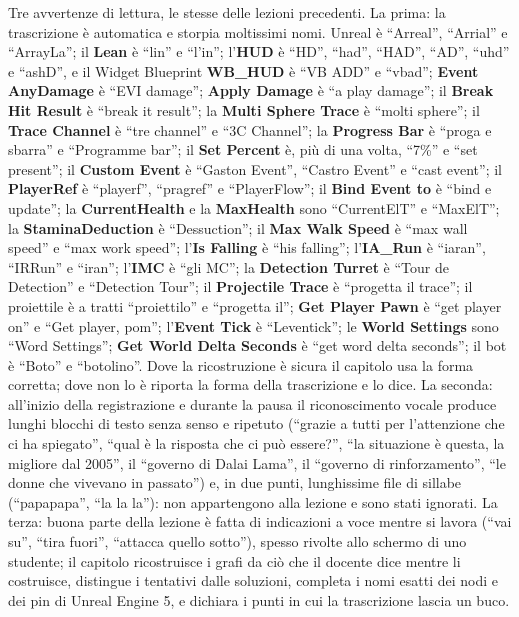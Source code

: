 Tre avvertenze di lettura, le stesse delle lezioni precedenti. La prima: la trascrizione
è automatica e storpia moltissimi nomi. Unreal è ``Arreal'', ``Arrial'' e ``ArrayLa'';
il \textbf{Lean} è ``lin'' e ``l'in''; l'\textbf{HUD} è ``HD'', ``had'', ``HAD'',
``AD'', ``uhd'' e ``ashD'', e il Widget Blueprint \textbf{WB\_HUD} è ``VB ADD'' e
``vbad''; \textbf{Event AnyDamage} è ``EVI damage''; \textbf{Apply Damage} è ``a play
damage''; il \textbf{Break Hit Result} è ``break it result''; la \textbf{Multi Sphere
Trace} è ``molti sphere''; il \textbf{Trace Channel} è ``tre channel'' e ``3C Channel'';
la \textbf{Progress Bar} è ``proga e sbarra'' e ``Programme bar''; il \textbf{Set
Percent} è, più di una volta, ``7\%'' e ``set present''; il \textbf{Custom Event} è
``Gaston Event'', ``Castro Event'' e ``cast event''; il \textbf{PlayerRef} è ``playerf'',
``pragref'' e ``PlayerFlow''; il \textbf{Bind Event to} è ``bind e update''; la
\textbf{CurrentHealth} e la \textbf{MaxHealth} sono ``CurrentElT'' e ``MaxElT''; la
\textbf{StaminaDeduction} è ``Dessuction''; il \textbf{Max Walk Speed} è ``max wall
speed'' e ``max work speed''; l'\textbf{Is Falling} è ``his falling''; l'\textbf{IA\_Run}
è ``iaran'', ``IRRun'' e ``iran''; l'\textbf{IMC} è ``gli MC''; la \textbf{Detection
Turret} è ``Tour de Detection'' e ``Detection Tour''; il \textbf{Projectile Trace} è
``progetta il trace''; il proiettile è a tratti ``proiettilo'' e ``progetta il'';
\textbf{Get Player Pawn} è ``get player on'' e ``Get player, pom''; l'\textbf{Event Tick}
è ``Leventick''; le \textbf{World Settings} sono ``Word Settings''; \textbf{Get World
Delta Seconds} è ``get word delta seconds''; il bot è ``Boto'' e ``botolino''. Dove la
ricostruzione è sicura il capitolo usa la forma corretta; dove non lo è riporta la forma
della trascrizione e lo dice. La seconda: all'inizio della registrazione e durante la
pausa il riconoscimento vocale produce lunghi blocchi di testo senza senso e ripetuto
(``grazie a tutti per l'attenzione che ci ha spiegato'', ``qual è la risposta che ci può
essere?'', ``la situazione è questa, la migliore dal 2005'', il ``governo di Dalai
Lama'', il ``governo di rinforzamento'', ``le donne che vivevano in passato'') e, in due
punti, lunghissime file di sillabe (``papapapa'', ``la la la''): non appartengono alla
lezione e sono stati ignorati. La terza: buona parte della lezione è fatta di indicazioni
a voce mentre si lavora (``vai su'', ``tira fuori'', ``attacca quello sotto''), spesso
rivolte allo schermo di uno studente; il capitolo ricostruisce i grafi da ciò che il
docente dice mentre li costruisce, distingue i tentativi dalle soluzioni, completa i
nomi esatti dei nodi e dei pin di Unreal Engine 5, e dichiara i punti in cui la
trascrizione lascia un buco.

